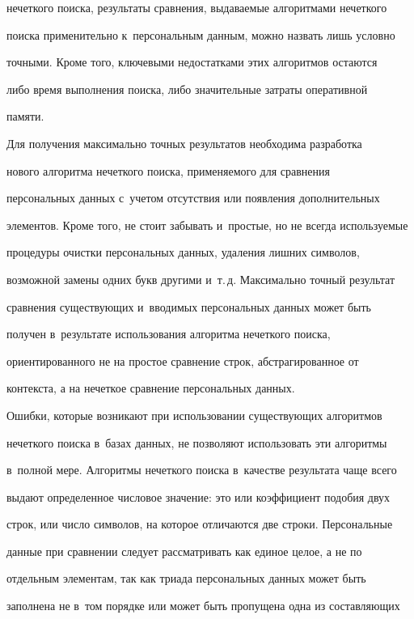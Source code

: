 нечеткого поиска, результаты сравнения, выдаваемые алгоритмами нечеткого 


поиска применительно к~персональным данным, можно назвать лишь условно 


точными. Кроме того, ключевыми недостатками этих алгоритмов остаются 


либо время выполнения поиска, либо значительные затраты оперативной 


памяти.


  


  Для получения максимально точных результатов необходима разработка 


нового алгоритма нечеткого поиска, применяемого для сравнения 


персональных данных с~учетом отсутствия или появления дополнительных 


элементов. Кроме того, не стоит забывать и~простые, но не всегда используемые 


процедуры очистки персональных данных, удаления лишних символов, 


возможной замены одних букв другими и~т.\,д. Максимально точный результат 


сравнения существующих и~вводимых персональных данных может быть 


получен в~результате использования алгоритма нечеткого поиска, 


ориентированного не на простое сравнение строк, абстрагированное от 


контекста, а на нечеткое сравнение персональных данных.


  


  Ошибки, которые возникают при использовании существующих алгоритмов 


нечеткого поиска в~базах данных, не позволяют использовать эти алгоритмы 


в~полной мере. Алгоритмы нечеткого поиска в~качестве результата чаще всего 


выдают определенное числовое значение: это или коэффициент подобия двух 


строк, или число символов, на которое отличаются две строки. Персональные 


данные при сравнении следует рассматривать как единое целое, а не по 


отдельным элементам, так как триада персональных данных может быть 


заполнена не в~том порядке или может быть пропущена одна из составляющих 


